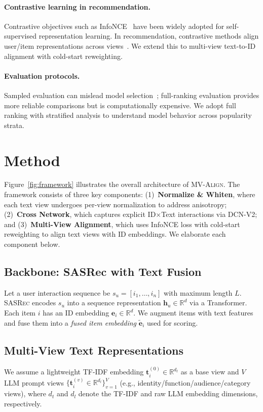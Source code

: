 \documentclass[sigconf,natbib=true,anonymous]{acmart}
\newcommand{\model}{\textsc{MV-Align}\xspace}
\newcommand{\base}{\textsc{SASRec}\xspace}
\newcommand{\tfidf}{\textsc{TF-IDF}\xspace}
\newcommand{\llm}{\textsc{LLM}\xspace}
\newcommand{\InfoNCE}{InfoNCE\xspace}
\begin{document}
\paragraph{Contrastive learning in recommendation.}
Contrastive objectives such as \InfoNCE~\cite{oord2018cpc}
have been widely adopted for self-supervised representation
learning. In recommendation, contrastive methods align
user/item representations across views~\cite{wu2021cl4rec}.
We extend this to multi-view text-to-ID alignment with
cold-start reweighting.

\paragraph{Evaluation protocols.}
Sampled evaluation can mislead model
selection~\cite{krichene2020sampledmetrics}; full-ranking
evaluation provides more reliable comparisons but is
computationally expensive. We adopt full ranking with
stratified analysis to understand model behavior across
popularity strata.


\section{Method}
Figure~\ref{fig:framework} illustrates the overall architecture of \model.
The framework consists of three key components:
(1)~\textbf{Normalize \& Whiten}, where each text view undergoes per-view normalization to address anisotropy;
(2)~\textbf{Cross Network}, which captures explicit ID$\times$Text interactions via DCN-V2;
and (3)~\textbf{Multi-View Alignment}, which uses InfoNCE loss with cold-start reweighting to align text views with ID embeddings.
We elaborate each component below.

\subsection{Backbone: SASRec with Text Fusion}
Let a user interaction sequence be $s_u = [i_1,\dots,i_n]$
with maximum length $L$. \base encodes $s_u$ into a sequence
representation $\mathbf{h}_u \in \mathbb{R}^d$ via a
Transformer. Each item $i$ has an ID embedding
$\mathbf{e}_i \in \mathbb{R}^d$. We augment items with text
features and fuse them into a \emph{fused item embedding}
$\tilde{\mathbf{e}}_i$ used for scoring.

\subsection{Multi-View Text Representations}\label{sec:whiten}
We assume a lightweight \tfidf embedding $\mathbf{t}_i^{(0)} \in \mathbb{R}^{d_t}$
as a base view and $V$ \llm prompt views
$\{\mathbf{t}_i^{(v)} \in \mathbb{R}^{d_l}\}_{v=1}^V$ (e.g.,
identity/function/audience/category views), where $d_t$ and $d_l$ denote the
\tfidf and raw \llm embedding dimensions, respectively.
\end{document}

